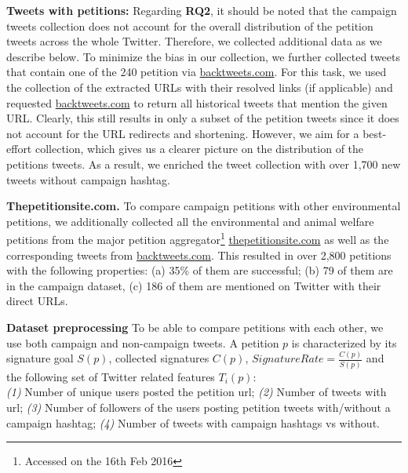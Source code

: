 \textbf{Tweets with petitions:}
Regarding \textbf{RQ2},
it should be noted that the campaign tweets collection does not account for the overall distribution of the petition tweets across the whole Twitter. 
Therefore, we collected additional data as we describe below.
To minimize the bias in our collection, we further collected tweets that contain one of the 240 petition via \url{backtweets.com}. For this task, we used the collection of the extracted URLs with their resolved links (if applicable) and requested \url{backtweets.com} to return all historical tweets that mention the given URL.
Clearly, this still results in only a subset of the petition tweets since it does not account for the URL redirects and shortening. However, we aim for a best-effort collection, which gives us a clearer picture on the distribution of the petitions tweets.
As a result, we enriched the tweet collection with over 1,700 new tweets without campaign hashtag.

\textbf{Thepetitionsite.com.} To compare campaign petitions with other environmental petitions, we additionally collected all the environmental and animal welfare petitions from the major petition aggregator\footnote{Accessed on the 16th Feb 2016} \url{thepetitionsite.com} as well as the corresponding tweets from \url{backtweets.com}. This resulted in over 2,800 petitions with the following properties: (a) 35\% of them are successful; (b) 79 of them are in the campaign dataset, (c) 186 of them are mentioned on Twitter with their direct URLs.

\textbf{Dataset preprocessing}
To be able to compare petitions with each other, we use both campaign and non-campaign tweets.
A petition $p$ is characterized by its signature goal $S(p)$, collected signatures $C(p)$, $SignatureRate = \frac{C(p)}{S(p)}$ and the following set of Twitter related features $T_i(p)$:\\
\textit{(1)} Number of unique users posted the petition url; 
\textit{(2)} Number of tweets with url;
\textit{(3)} Number of followers of the users posting petition tweets with/without a campaign hashtag;
\textit{(4)} Number of tweets with campaign hashtags vs without.
